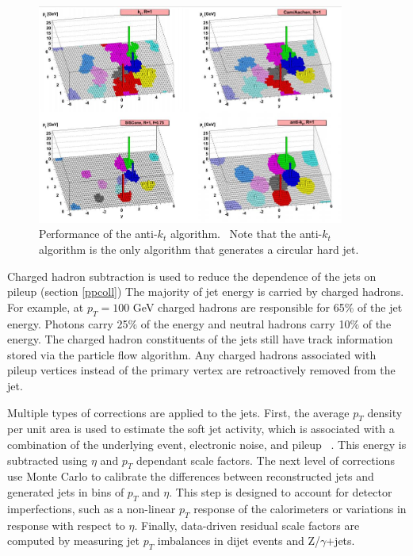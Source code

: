\documentclass[oneside, letterpaper, oldfontcommands]{memoir}
\begin{document}
\begin{figure}[here]
\includegraphics[width=0.9\textwidth]{antikt.jpg}
\caption{Performance of the anti-$k_{t}$ algorithm.~\cite{Cacciari:2008gp} Note that the anti-$k_{t}$ algorithm is the only algorithm that generates a circular hard jet. }
\label{fig:antikt}
\end{figure}

\qquad Charged hadron subtraction is used to reduce the dependence of the jets on pileup (section \ref{ppcoll}) The majority of jet energy is carried by charged hadrons. For example, at $p_{T} = 100$ GeV charged hadrons are responsible for 65$\%$ of the jet energy. Photons carry 25$\%$ of the energy and neutral hadrons carry 10$\%$ of the energy. The charged hadron constituents of the jets still have track information stored via the particle flow algorithm. Any charged hadrons associated with pileup vertices instead of the primary vertex are retroactively removed from the jet.~\cite{Kirschenmann:1627818}

\qquad Multiple types of corrections are applied to the jets. First, the average $p_{T}$ density per unit area is used to estimate the soft jet activity, which is associated with a combination of the underlying event, electronic noise, and pileup ~\cite{Kirschenmann:1627818}. This energy is subtracted using $\eta$ and $p_{T}$ dependant scale factors. The next level of corrections use Monte Carlo to calibrate the differences between reconstructed jets and generated jets in bins of $p_{T}$ and $\eta$. This step is designed to account for detector imperfections, such as a non-linear $p_{T}$ response of the calorimeters or variations in response with respect to $\eta$. Finally, data-driven residual scale factors are computed by measuring jet $p_{T}$ imbalances in dijet events and Z/$\gamma$+jets.
\end{document}
